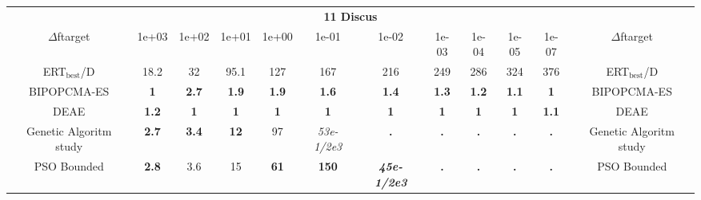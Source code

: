 \begin{tabular}{cccccccccccc}
 & \multicolumn{10}{c}{{\normalsize \textbf{11 Discus}}}\\
$\Delta$ftarget& 1e+03& 1e+02& 1e+01& 1e+00& 1e-01& 1e-02& 1e-03& 1e-04& 1e-05& 1e-07 & $\Delta$ftarget \\
ERT$_{\textrm{best}}$/D& 18.2& 32& 95.1& 127& 167& 216& 249& 286& 324& 376 & ERT$_{\textrm{best}}$/D \\
\hline
BIPOPCMA-ES & \textbf{1} & \textbf{2.7} & \textbf{1.9} & \textbf{1.9} & \textbf{1.6} & \textbf{1.4} & \textbf{1.3} & \textbf{1.2} & \textbf{1.1} & \textbf{1} & BIPOPCMA-ES \cite{add_an_entry_for_BIPOPCMA-ES_in_bbob.bib}\\
DEAE & \textbf{1.2} & \textbf{1} & \textbf{1} & \textbf{1} & \textbf{1} & \textbf{1} & \textbf{1} & \textbf{1} & \textbf{1} & \textbf{1.1} & DEAE \cite{add_an_entry_for_DEAE_in_bbob.bib}\\
Genetic Algoritm study & \textbf{2.7} & \textbf{3.4} & \textbf{12} & 97 & \textit{53e-1}\textit{/2e3} & \textbf{.} & \textbf{.} & \textbf{.} & \textbf{.} & \textbf{.} & Genetic Algoritm study \cite{add_an_entry_for_Genetic Algoritm study_in_bbob.bib}\\
PSO Bounded & \textbf{2.8} & 3.6 & 15 & \textbf{61} & \textbf{150} & \textbf{\textit{45e-1}\textit{/2e3}} & \textbf{.} & \textbf{.} & \textbf{.} & \textbf{.} & PSO Bounded \cite{add_an_entry_for_PSO Bounded_in_bbob.bib}
\end{tabular}
